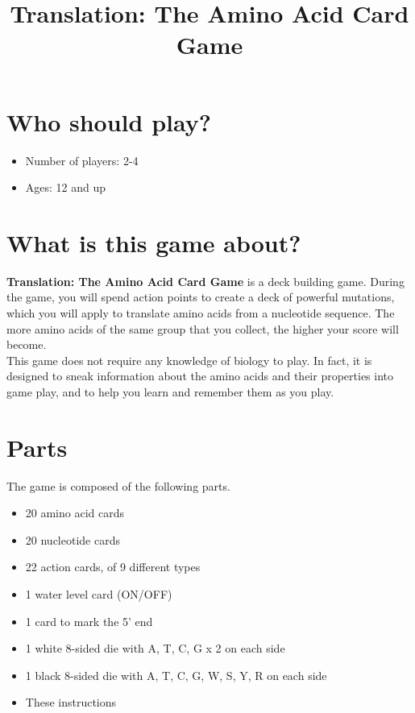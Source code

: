 \documentclass[a4paper,11pt,oneside]{memoir}
\title{Translation: The Amino Acid Card Game}
\author{}
\date{}
\begin{document}
\maketitle


\section*{Who should play?}

\begin{itemize}
    \item Number of players: 2-4
    \item Ages: 12 and up
\end{itemize}


\section*{What is this game about?}

\textbf{Translation: The Amino Acid Card Game} is a deck building game.
During the game, you will spend action points to create a deck of powerful mutations, which you will apply to translate amino acids from a nucleotide sequence.
The more amino acids of the same group that you collect, the higher your score will become. \\

This game does not require any knowledge of biology to play.
In fact, it is designed to sneak information about the amino acids and their properties into game play, and to help you learn and remember them as you play.


\section*{Parts}

The game is composed of the following parts.
\begin{itemize}
    \item 20 amino acid cards
    \item 20 nucleotide cards
    \item 22 action cards, of 9 different types
    \item 1 water level card (ON/OFF)
    \item 1 card to mark the 5' end
    \item 1 white 8-sided die with A, T, C, G x 2 on each side 
    \item 1 black 8-sided die with A, T, C, G, W, S, Y, R on each side 
    \item These instructions
\end{itemize}
\end{document}
